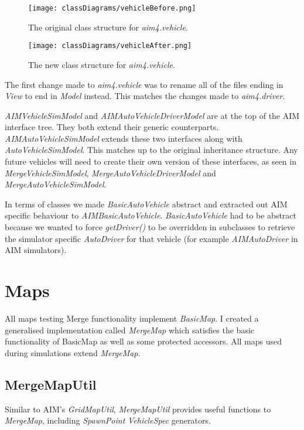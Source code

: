 \begin{figure}[htb]
\texttt{[image: classDiagrams/vehicleBefore.png]}
\caption{The original class structure for \emph{aim4.vehicle}.}
\label{fig:vehicleBefore}
\end{figure}

\begin{figure}[htb]
\texttt{[image: classDiagrams/vehicleAfter.png]}
\caption{The new class structure for \emph{aim4.vehicle}.}
\label{fig:vehicleAfter}
\end{figure}

The first change made to \emph{aim4.vehicle} was to rename all of the files ending in \emph{View} to end in \emph{Model} instead. This matches the changes made to \emph{aim4.driver}.

\emph{AIMVehicleSimModel} and \emph{AIMAutoVehicleDriverModel} are at the top of the AIM interface tree. They both extend their generic counterparts. \emph{AIMAutoVehicleSimModel} extends these two interfaces along with \emph{AutoVehicleSimModel}. This matches up to the original inheritance structure. Any future vehicles will need to create their own version of these interfaces, as seen in \emph{MergeVehicleSimModel}, \emph{MergeAutoVehicleDriverModel} and \emph{MergeAutoVehicleSimModel}. 

In terms of classes we made \emph{BasicAutoVehicle} abstract and extracted out AIM specific behaviour to \emph{AIMBasicAutoVehicle}. \emph{BasicAutoVehicle} had to be abstract because we wanted to force \emph{getDriver()} to be overridden in subclasses to retrieve the simulator specific \emph{AutoDriver} for that vehicle (for example \emph{AIMAutoDriver} in AIM simulators). 

\section{Maps}
\label{sec:Maps}
All maps testing Merge functionality implement \emph{BasicMap}. I created a generalised implementation called \emph{MergeMap} which satisfies the basic functionality of BasicMap as well as some protected accessors. All maps used during simulations extend \emph{MergeMap}.

\subsection{MergeMapUtil}
\label{sec:MergeMapUtil}
Similar to AIM's \emph{GridMapUtil}, \emph{MergeMapUtil} provides useful functions to \emph{MergeMap}, including \emph{SpawnPoint} \emph{VehicleSpec} generators.

